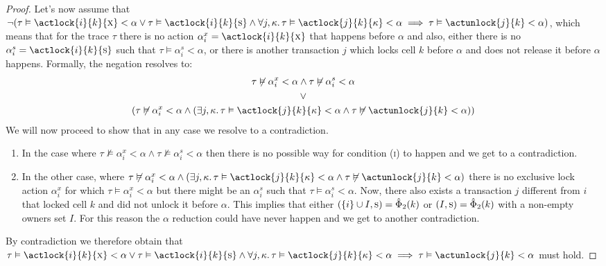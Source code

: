 \begin{proof}
Let's now assume that $\lnot (\tau \vDash \actlock{i}{k}{\textsc{x}} < \alpha \lor
\tau \vDash \actlock{i}{k}{\textsc{s}} \land \forall j, \kappa \ldotp \tau \vDash \actlock{j}{k}{\kappa} < \alpha \implies \tau \vDash \actunlock{j}{k} < \alpha)$, which means that for the trace $\tau$ there is no action $\alpha_i^x = \actlock{i}{k}{\textsc{x}}$ that happens before $\alpha$ and also, either there is no $\alpha_i^s = \actlock{i}{k}{\textsc{s}}$ such that $\tau \vDash \alpha_i^s < \alpha$, or there is another transaction $j$ which locks cell $k$ before $\alpha$ and does not release it before $\alpha$ happens. Formally, the negation resolves to:
\begin{gather*}
\tau \not\vDash \alpha_i^x < \alpha \land \tau \not\vDash \alpha_i^s < \alpha \\
\lor \\
\left( \tau \not\vDash \alpha_i^x < \alpha \land \left( \exists j, \kappa \ldotp \tau \vDash \actlock{j}{k}{\kappa} < \alpha \land \tau \not\vDash \actunlock{j}{k} < \alpha \right) \right)
\end{gather*}
We will now proceed to show that in any case we resolve to a contradiction.
\begin{enumerate}
\item In the case where $\tau \not\vDash \alpha_i^x < \alpha \land \tau \not\vDash \alpha_i^s < \alpha$ then there is no possible way for condition (\textsc{i}) to happen and we get to a contradiction.
\item In the other case, where $\tau \not\vDash \alpha_i^x < \alpha \land \left( \exists j, \kappa \ldotp \tau \vDash \actlock{j}{k}{\kappa} < \alpha \land \tau \not\vDash \actunlock{j}{k} < \alpha \right)$ there is no exclusive lock action $\alpha_i^x$ for which $\tau \vDash \alpha_i^x < \alpha$ but there might be an $\alpha_i^s$ such that $\tau \vDash \alpha_i^s < \alpha$. Now, there also exists a transaction $j$ different from $i$ that locked cell $k$ and did not unlock it before $\alpha$. This implies that either $(\{i\} \cup I, \textsc{s}) = \hat{\Phi}_2(k)$ or $(I, \textsc{s}) = \hat{\Phi}_2(k)$ with a non-empty owners set $I$. For this reason the $\alpha$ reduction could have never happen and we get to another contradiction.
\end{enumerate}
By contradiction we therefore obtain that $\tau \vDash \actlock{i}{k}{\textsc{x}} < \alpha \lor
\tau \vDash \actlock{i}{k}{\textsc{s}} \land \forall j, \kappa \ldotp \tau \vDash \actlock{j}{k}{\kappa} < \alpha \implies \tau \vDash \actunlock{j}{k} < \alpha$ must hold.
\end{proof}

